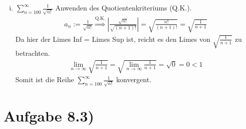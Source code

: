 \documentclass{scrartcl}
\begin{document}
\begin{enumerate}[(i)]
		\item $\sum^{\infty}_{n=100}\frac{1}{\sqrt{n!}}$ Anwenden des Quotientenkriteriums (Q.K.).
			\begin{align*}
				a_n:=\frac{1}{\sqrt{n!}} \overset{\text{Q.K.}}{\Longrightarrow} \left|\frac{\sqrt{n!}}{\sqrt{(n+1)!}}\right| = \sqrt{\frac{n!}{(n+1)!}}= \sqrt{\frac{1}{n+1}}
			\end{align*}
			Da hier der Limes Inf = Limes Sup ist, reicht es den Limes von $\sqrt{\frac{1}{n+1}}$ zu betrachten.
			\begin{align*}
				\lim_{n \to \infty} \sqrt{\frac{1}{n+1}} = \sqrt{\lim_{n \to \infty} \frac{1}{n+1}} = \sqrt{0} = 0 < 1
			\end{align*}
			Somit ist die Reihe $\sum^{\infty}_{n=100}\frac{1}{\sqrt{n!}}$ konvergent.
	\end{enumerate}

\section*{Aufgabe 8.3)}
\end{document}
